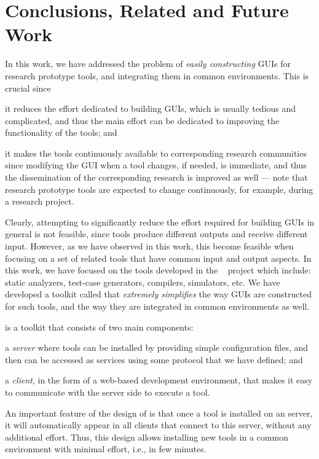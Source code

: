 {%
}

\chapter{Conclusions, Related and Future Work}
\label{ch:conclusions}


In this work, we have addressed the problem of \emph{easily
  constructing} GUIs for research prototype tools, and integrating
them in common environments. This is crucial since
%
\begin{inparaenum}
%
\item it reduces the effort dedicated to building GUIs, which is
  usually tedious and complicated, and thus the main effort can be
  dedicated to improving the functionality of the tools; and
%
\item it makes the tools continuously available to corresponding
  research communities since modifying the GUI when a tool changes, if
  needed, is immediate, and thus the dissemination of the
  corresponding research is improved as well --- note that research
  prototype tools are expected to change continuously, for example,
  during a research project.
%
\end{inparaenum}

Clearly, attempting to significantly reduce the effort required for
building GUIs in general is not feasible, since tools produce
different outputs and receive different input. However, as we have
observed in this work, this become feasible when focusing on a set
of related tools that have common input and output aspects. In this
work, we have focused on the tools developed in the
\envisage~\cite{envisage} project which include: static analyzers,
test-case generators, compilers, simulators, etc. We have developed a
toolkit called \ei that \emph{extremely simplifies} the way GUIs are
constructed for such tools, and the way they are integrated in common
environments as well.


\ei is a toolkit that consists of two main components:
%
\begin{inparaenum}[(1)]
%
\item a \emph{server} where tools can be installed by providing simple
  configuration files, and then can be accessed as services using some
  protocol that we have defined; and
%
\item a \emph{client}, in the form of a web-based development
  environment, that makes it easy to communicate with the server side
  to execute a tool.
%
\end{inparaenum}
%
An important feature of the design of \ei is that once a tool is
installed on an \ei server, it will automatically appear in all \ei
clients that connect to this server, without any additional
effort. Thus, this design allows installing new tools in a common
environment with minimal effort, i.e., in few minutes.

